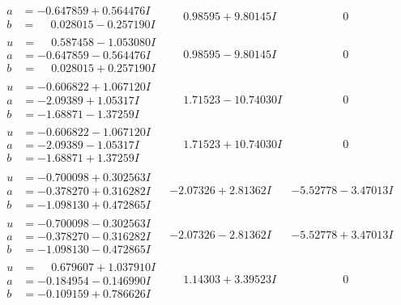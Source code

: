 \documentclass[1p]{elsarticle_modified}
\theoremstyle{definition}
\begin{document}
$$\begin{array}{c|c|c}
\begin{aligned}
a &= -0.647859 + 0.564476 I \\
b &= \phantom{-}0.028015 - 0.257190 I\end{aligned}
 & \phantom{-}0.98595 + 9.80145 I & \phantom{-0.000000 } 0 \\ \hline\begin{aligned}
u &= \phantom{-}0.587458 - 1.053080 I \\
a &= -0.647859 - 0.564476 I \\
b &= \phantom{-}0.028015 + 0.257190 I\end{aligned}
 & \phantom{-}0.98595 - 9.80145 I & \phantom{-0.000000 } 0 \\ \hline\begin{aligned}
u &= -0.606822 + 1.067120 I \\
a &= -2.09389 + 1.05317 I \\
b &= -1.68871 - 1.37259 I\end{aligned}
 & \phantom{-}1.71523 - 10.74030 I & \phantom{-0.000000 } 0 \\ \hline\begin{aligned}
u &= -0.606822 - 1.067120 I \\
a &= -2.09389 - 1.05317 I \\
b &= -1.68871 + 1.37259 I\end{aligned}
 & \phantom{-}1.71523 + 10.74030 I & \phantom{-0.000000 } 0 \\ \hline\begin{aligned}
u &= -0.700098 + 0.302563 I \\
a &= -0.378270 + 0.316282 I \\
b &= -1.098130 + 0.472865 I\end{aligned}
 & -2.07326 + 2.81362 I & -5.52778 - 3.47013 I \\ \hline\begin{aligned}
u &= -0.700098 - 0.302563 I \\
a &= -0.378270 - 0.316282 I \\
b &= -1.098130 - 0.472865 I\end{aligned}
 & -2.07326 - 2.81362 I & -5.52778 + 3.47013 I \\ \hline\begin{aligned}
u &= \phantom{-}0.679607 + 1.037910 I \\
a &= -0.184954 - 0.146990 I \\
b &= -0.109159 + 0.786626 I\end{aligned}
 & \phantom{-}1.14303 + 3.39523 I & \phantom{-0.000000 } 0 \\ \hline\begin{aligned}

\end{aligned}
\end{array}$$
\end{document}
